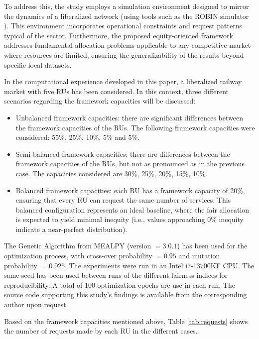 \documentclass[preprint,12pt]{elsarticle}
\begin{document}
To address this, the study employs a simulation environment designed to mirror the dynamics of a liberalized network (using tools such as the ROBIN simulator \cite{delCastillo-Herrera2024ROBIN:SimulatioNb}). This environment incorporates operational constraints and request patterns typical of the sector. Furthermore, the proposed equity-oriented framework addresses fundamental allocation problems applicable to any competitive market where resources are limited, ensuring the generalizability of the results beyond specific local datasets.

In the computational experience developed in this paper, a liberalized railway market with five \glspl{RU} has been considered. In this context, three different scenarios regarding the framework capacities will be discussed: 

\begin{itemize}
    \item Unbalanced framework capacities: there are significant differences between the framework capacities of the RUs. The following framework capacities were considered: 55\%, 25\%, 10\%, 5\% and 5\%.
    \item Semi-balanced framework capacities: there are differences between the framework capacities of the RUs, but not as pronounced as in the previous case. The capacities considered are 30\%, 25\%, 20\%, 15\%, 10\%.
    \item Balanced framework capacities: each RU has a framework capacity of 20\%, ensuring that every RU can request the same number of services. This balanced configuration represents an ideal baseline, where the fair allocation is expected to yield minimal inequity (i.e., values approaching 0\% inequity indicate a near-perfect distribution).
\end{itemize}

The Genetic Algorithm from MEALPY (version $ =3.0.1 $) has been used for the optimization process, with cross-over probability $ = 0.95 $ and mutation probability $ = 0.025 $. The experiments were run in an Intel i7-13700KF CPU. The same seed has been used between runs of the different fairness indices for reproducibility. A total of 100 optimization epochs are use in each run. The source code supporting this study’s findings is available from the corresponding author upon request.

Based on the framework capacities mentioned above, Table \ref{tab:requests} shows the number of requests made by each RU in the different cases.
\end{document}
